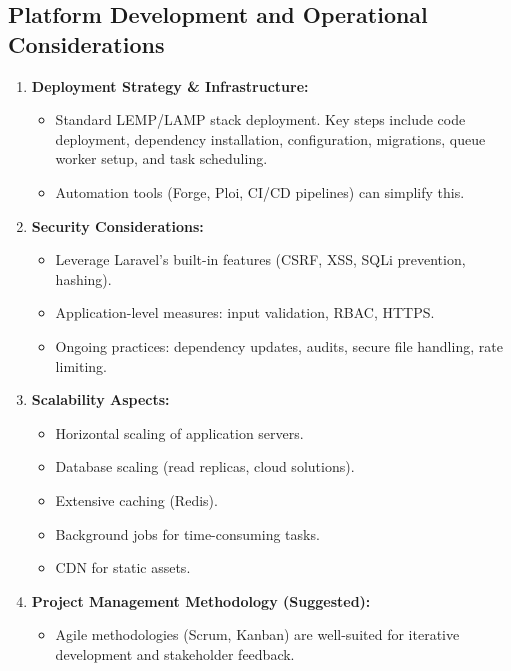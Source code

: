 \documentclass[12pt,a4paper]{article}
\begin{document}
\subsection{Platform Development and Operational Considerations}
\begin{enumerate}
    \item \textbf{Deployment Strategy \& Infrastructure:}
    \begin{itemize}
        \item Standard LEMP/LAMP stack deployment. Key steps include code deployment, dependency installation, configuration, migrations, queue worker setup, and task scheduling.
        \item Automation tools (Forge, Ploi, CI/CD pipelines) can simplify this.
    \end{itemize}
    \item \textbf{Security Considerations:}
    \begin{itemize}
        \item Leverage Laravel's built-in features (CSRF, XSS, SQLi prevention, hashing).
        \item Application-level measures: input validation, RBAC, HTTPS.
        \item Ongoing practices: dependency updates, audits, secure file handling, rate limiting.
    \end{itemize}
    \item \textbf{Scalability Aspects:}
    \begin{itemize}
        \item Horizontal scaling of application servers.
        \item Database scaling (read replicas, cloud solutions).
        \item Extensive caching (Redis).
        \item Background jobs for time-consuming tasks.
        \item CDN for static assets.
    \end{itemize}
    \item \textbf{Project Management Methodology (Suggested):}
    \begin{itemize}
        \item Agile methodologies (Scrum, Kanban) are well-suited for iterative development and stakeholder feedback.
    \end{itemize}
\end{enumerate}
\clearpage
\end{document}
